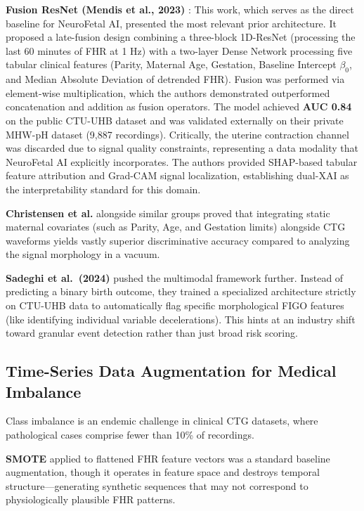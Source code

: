\documentclass[conference]{IEEEtran}
\begin{document}
\textbf{Fusion ResNet (Mendis et al., 2023)} \cite{mendis2023}: This work,
which serves as the direct baseline for NeuroFetal AI, presented the most
relevant prior architecture. It proposed a late-fusion design combining a
three-block 1D-ResNet (processing the last 60 minutes of FHR at 1 Hz) with a
two-layer Dense Network processing five tabular clinical features (Parity,
Maternal Age, Gestation, Baseline Intercept $\beta_0$, and Median Absolute
Deviation of detrended FHR). Fusion was performed via element-wise
multiplication, which the authors demonstrated outperformed concatenation and
addition as fusion operators. The model achieved \textbf{AUC 0.84} on the
public CTU-UHB dataset and was validated externally on their private MHW-pH
dataset (9,887 recordings). Critically, the uterine contraction channel was
discarded due to signal quality constraints, representing a data modality that
NeuroFetal AI explicitly incorporates. The authors provided SHAP-based
tabular feature attribution and Grad-CAM signal localization, establishing
dual-XAI as the interpretability standard for this domain.

\textbf{Christensen et al.} alongside similar groups proved that integrating static maternal covariates (such as Parity, Age, and Gestation limits) alongside CTG waveforms yields vastly superior discriminative accuracy compared to analyzing the signal morphology in a vacuum.

\textbf{Sadeghi et al.\ (2024)} \cite{sadeghi2024} pushed the multimodal framework further. Instead of predicting a binary birth outcome, they trained a specialized architecture strictly on CTU-UHB data to automatically flag specific morphological FIGO features (like identifying individual variable decelerations). This hints at an industry shift toward granular event detection rather than just broad risk scoring.

\subsection{Time-Series Data Augmentation for Medical Imbalance}

Class imbalance is an endemic challenge in clinical CTG datasets, where
pathological cases comprise fewer than 10\% of recordings.

\textbf{SMOTE} \cite{chawla2002} applied to flattened FHR feature vectors was
a standard baseline augmentation, though it operates in feature space and
destroys temporal structure—generating synthetic sequences that may not
correspond to physiologically plausible FHR patterns.
\end{document}
